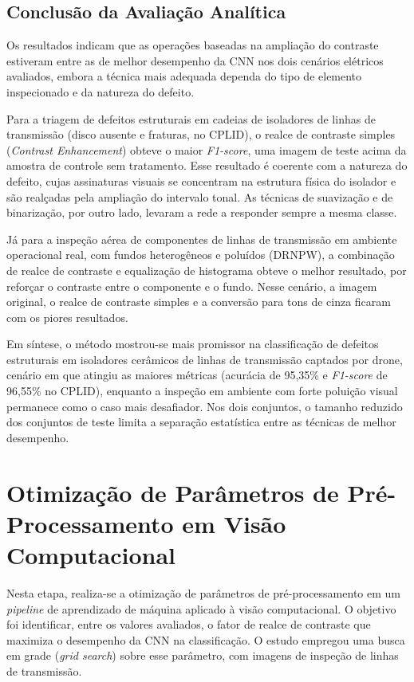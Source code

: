 \subsection{Conclusão da Avaliação Analítica}

Os resultados indicam que as operações baseadas na ampliação do contraste estiveram entre as de melhor desempenho da CNN nos dois cenários elétricos avaliados, embora a técnica mais adequada dependa do tipo de elemento inspecionado e da natureza do defeito.

Para a triagem de defeitos estruturais em cadeias de isoladores de linhas de transmissão (disco ausente e fraturas, no CPLID), o realce de contraste simples (\textit{Contrast Enhancement}) obteve o maior \textit{F1-score}, uma imagem de teste acima da amostra de controle sem tratamento. Esse resultado é coerente com a natureza do defeito, cujas assinaturas visuais se concentram na estrutura física do isolador e são realçadas pela ampliação do intervalo tonal. As técnicas de suavização e de binarização, por outro lado, levaram a rede a responder sempre a mesma classe.

Já para a inspeção aérea de componentes de linhas de transmissão em ambiente operacional real, com fundos heterogêneos e poluídos (DRNPW), a combinação de realce de contraste e equalização de histograma obteve o melhor resultado, por reforçar o contraste entre o componente e o fundo. Nesse cenário, a imagem original, o realce de contraste simples e a conversão para tons de cinza ficaram com os piores resultados.

Em síntese, o método mostrou-se mais promissor na classificação de defeitos estruturais em isoladores cerâmicos de linhas de transmissão captados por drone, cenário em que atingiu as maiores métricas (acurácia de 95,35\% e \textit{F1-score} de 96,55\% no CPLID), enquanto a inspeção em ambiente com forte poluição visual permanece como o caso mais desafiador. Nos dois conjuntos, o tamanho reduzido dos conjuntos de teste limita a separação estatística entre as técnicas de melhor desempenho.

\section{Otimização de Parâmetros de Pré-Processamento em Visão Computacional}

Nesta etapa, realiza-se a otimização de parâmetros de pré-processamento em um \textit{pipeline} de aprendizado de máquina aplicado à visão computacional. O objetivo foi identificar, entre os valores avaliados, o fator de realce de contraste que maximiza o desempenho da CNN na classificação. O estudo empregou uma busca em grade (\textit{grid search}) sobre esse parâmetro, com imagens de inspeção de linhas de transmissão.

